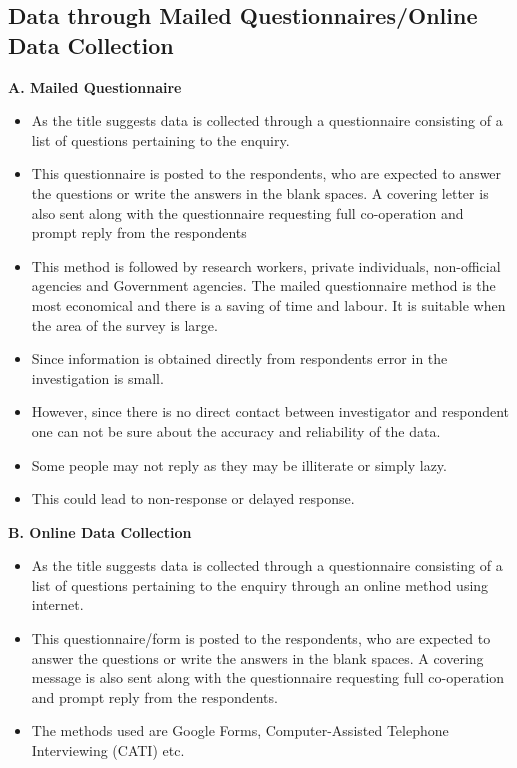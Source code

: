 \documentclass[
10pt, %
a4paper, %
]{report}
\begin{document}
\subsection*{Data through Mailed Questionnaires/Online Data Collection}
\textbf{A. Mailed Questionnaire}
\begin{itemize}
\item As the title suggests data is collected through a questionnaire consisting of a list of questions pertaining to the enquiry.
\item This questionnaire is posted to the respondents, who are expected to answer the questions or write the answers in the blank spaces. A covering letter is also sent along with the questionnaire requesting full co-operation and prompt reply from the respondents
\item This method is followed by research workers, private individuals, non-official agencies and Government agencies. The mailed questionnaire method is the most economical and there is a saving of time and labour. It is suitable when the area of the  survey is large.
\item Since information is obtained directly from respondents error in the investigation is small.
\item However, since there is no direct contact between investigator and respondent one can not be sure about the accuracy and reliability of the data.
\item Some people may not reply as they may be illiterate or simply lazy.
\item This could lead to non-response or delayed response.
\end{itemize}
\textbf{B. Online Data Collection}
\begin{itemize}
\item As the title suggests data is collected through a questionnaire consisting of a list of questions pertaining to the enquiry through an online method using internet.
\item This questionnaire/form is posted to the respondents, who are expected to answer the questions or write the answers in the blank spaces. A covering message is also sent along with the questionnaire requesting full co-operation and prompt reply from the respondents.
\item The methods used are Google Forms, Computer-Assisted Telephone Interviewing (CATI) etc.
\end{itemize}
\end{document}
